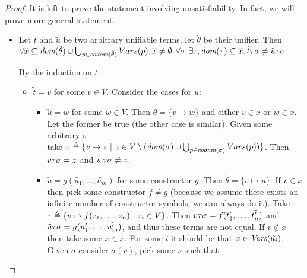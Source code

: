 \begin{proof}
  It is left to prove the statement involving unsatisfiability.
  In fact, we will prove more general statement.
  \begin{itemize}
    \item Let $\tilde{t}$ and $\tilde{u}$ be two arbitrary unifiable terms, 
          let $\tilde{\theta}$ be their unifier. Then \\
          $\forall \overline{x} \subseteq \textit{dom}{({\tilde{\theta}})} \cup \bigcup_{p \in \textit{codom}{({\tilde{\theta}})}}Vars(p), 
           \overline{x} \neq \emptyset \ldotp 
           \forall \sigma \ldotp \exists \tau, \textit{dom}{({\tau})} \subseteq \overline{x}\ldotp 
             {{\tilde{t}}{\tau}}{\sigma} \neq {{\tilde{u}}{\tau}}{\sigma}
          $
    \begin{subproof}
      By the induction on $t$:
      \begin{itemize}
        \item $\tilde{t} = v$ for some $v \in V$. Consider the cases for $u$:
        \begin{itemize}
          \item $\tilde{u} = w$ for some $w \in V$.
            Then $\tilde{\theta} = \{v \mapsto w\}$ and either $v \in \overline{x}$ or $w \in \overline{x}$. \\
            Let the former be true (the other case is similar).
            Given some arbitrary $\sigma$ \\
            take ${\tau \triangleq \{ v \mapsto z ~|~ z \in V \setminus (\textit{dom}{({\sigma})} \cup \bigcup_{p \in \textit{codom}{({\sigma})}} Vars(p))\}}$.
            Then ${{v}{\tau}}{\sigma} = z$ and
            ${{w}{\tau}}{\sigma} \neq z$.
          \item $\tilde{u} = g(\tilde{u_1}, \dots, \tilde{u_m})$ for some constructor $g$.
            Then $\tilde{\theta} = \{v \mapsto u\}$.
            If $v \in \overline{x}$ then pick some constructor $f \neq g$
            (because we assume there exists an infinite number of constructor symbols, we can always do it).
            Take ${\tau \triangleq \{ v \mapsto f(z_1, \dots, z_n) ~|~ z_i \in V\}}$.
            Then ${{v}{\tau}}{\sigma} = f(\tilde{t'_1}, \dots, \tilde{t'_n})$
            and ${{\tilde{u}}{\tau}}{\sigma} = g(\tilde{u'_1}, \dots, \tilde{u'_m})$,
            and thus these terms are not equal.
            If $v \not\in \overline{x}$ then take some $x \in \overline{x}$. 
            For some $i$ it should be that $x \in \textit{Vars}({\tilde{u_i}})$.
            Given $\sigma$ consider $\sigma(v)$, pick some $s$ such that 

\end{itemize}
\end{itemize}
\end{subproof}
\end{itemize}
\end{proof}
